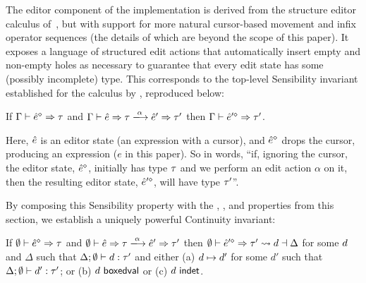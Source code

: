The editor component of the \Hazel implementation is derived
from the structure editor calculus of~\Hazelnut, but with support for more natural cursor-based movement and infix operator sequences (the details of which are beyond the scope of this paper). It exposes a language of structured
edit actions that automatically insert empty and non-empty holes as necessary
to guarantee that every edit state has some (possibly incomplete) type. This corresponds to the top-level Sensibility invariant established for the \Hazelnut calculus by \citet{popl-paper}, reproduced below:
\begin{prop}[Sensibility]
  \label{thrm:sensibility}
  If $\Gamma \vdash \hat{e}^{\diamond} \Rightarrow \tau$ and
    $\performSyn{\Gamma}{\zexp}{\htau}{\alpha}{\zexp'}{\tau'}$ then
    $\Gamma \vdash \hat{e}'^{\diamond} \Rightarrow \tau'$.
\end{prop}
\noindent
Here, $\hat{e}$ is an editor state (an expression with a cursor), and $\hat{e}^{\diamond}$ drops the cursor, producing an expression ($e$ in this paper). So in words, ``if, ignoring the cursor, the editor state, $\hat{e}^{\diamond}$, initially has type $\tau$ and we perform an edit action $\alpha$ on it, then the resulting editor state, $\hat{e}'^{\diamond}$, will have type $\tau'$''.


By composing this Sensibility property with the ,
,  and
 properties from this section, we establish a
uniquely powerful Continuity invariant:
\begin{corol}[Continuity]
  \label{thrm:continuity}
  If $\emptyset \vdash \hat{e}^{\diamond} \Rightarrow \tau$ and
    $\performSyn{\emptyset}{\zexp}{\htau}{\alpha}{\zexp'}{\tau'}$ then
    $\emptyset \vdash \hat{e}'^{\diamond} \Rightarrow \tau' \leadsto d \dashv \Delta$
      for some $d$ and $\Delta$ such that
$\Delta; \emptyset \vdash d : \tau'$
and either
  (a) $d \mapsto d'$ for some $d'$ such that $\Delta; \emptyset \vdash d' : \tau'$; or
  (b) $d~\mathsf{boxedval}$ or
  (c) $d~\mathsf{indet}$.
\end{corol}

